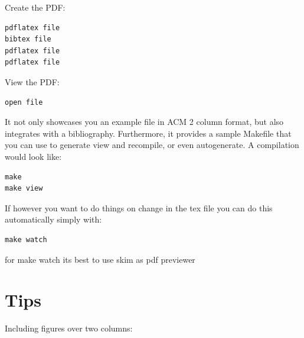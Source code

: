 Create the PDF:

\begin{verbatim}
pdflatex file
bibtex file
pdflatex file
pdflatex file
\end{verbatim}

View the PDF:

\begin{verbatim}
open file
\end{verbatim}

It not only showcases you an example file in ACM 2 column format, but
also integrates with a bibliography. Furthermore, it provides a sample
Makefile that you can use to generate view and recompile, or even
autogenerate. A compilation would look like:

\begin{verbatim}
make
make view
\end{verbatim}

If however you want to do things on change in the tex file you can do
this automatically simply with:

\begin{verbatim}
make watch
\end{verbatim}

for make watch its best to use skim as pdf previewer


\section{Tips}\label{tips}

Including figures over two columns:

